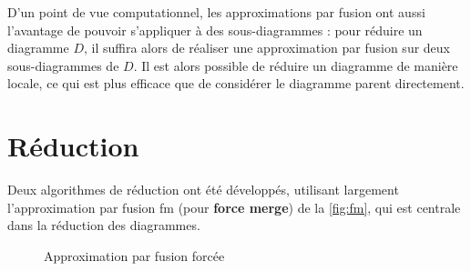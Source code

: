 D'un point de vue computationnel, les approximations par fusion ont aussi l'avantage de pouvoir s'appliquer à des sous-diagrammes : pour réduire un diagramme $D$, il suffira alors de réaliser une approximation par fusion sur deux sous-diagrammes de $D$. Il est alors possible de réduire un diagramme de manière locale, ce qui est plus efficace que de considérer le diagramme parent directement.

\section{Réduction}

Deux algorithmes de réduction ont été développés, utilisant largement l'approximation par fusion fm (pour \textbf{force merge}) de la \autoref{fig:fm}, qui est centrale dans la réduction des diagrammes.

\begin{figure}[H]
  \centering
\caption{Approximation par fusion forcée}
\label{fig:fm}
\end{figure}

